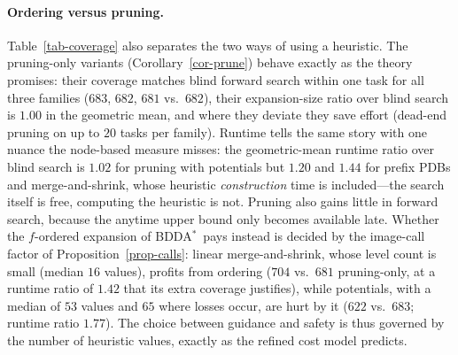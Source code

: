 \documentclass[letterpaper]{article}
\newcommand{\bddastar}{BDDA\ensuremath{^{*}}}
\theoremstyle{plain}
\theoremstyle{definition}
\theoremstyle{remark}
\begin{document}
\paragraph{Ordering versus pruning.}
Table~\ref{tab-coverage} also separates the two ways of using a
heuristic. The pruning-only variants (Corollary~\ref{cor-prune}) behave
exactly as the theory promises: their coverage matches blind forward
search within one task for all three families ($683$, $682$, $681$
vs.\ $682$), their expansion-size ratio over blind search is $1.00$ in
the geometric mean, and where they deviate they save effort (dead-end
pruning on up to $20$ tasks per family). Runtime tells the same story
with one nuance the node-based measure misses: the geometric-mean
runtime ratio over blind search is $1.02$ for pruning with potentials
but $1.20$ and $1.44$ for prefix PDBs and merge-and-shrink, whose
heuristic \emph{construction} time is included---the search itself is
free, computing the heuristic is not. Pruning also gains little in
forward search, because the anytime upper bound only becomes available
late. Whether the $f$-ordered expansion of
\bddastar\ pays instead is decided by the image-call factor of
Proposition~\ref{prop-calls}: linear merge-and-shrink, whose level count
is small (median $16$ values), profits from ordering ($704$ vs.\ $681$
pruning-only, at a runtime ratio of $1.42$ that its extra coverage
justifies), while potentials, with a median of $53$ values and $65$
where losses occur, are hurt by it ($622$ vs.\ $683$; runtime ratio
$1.77$). The choice between guidance and safety is thus governed by the
number of heuristic values, exactly as the refined cost model predicts.
\end{document}
